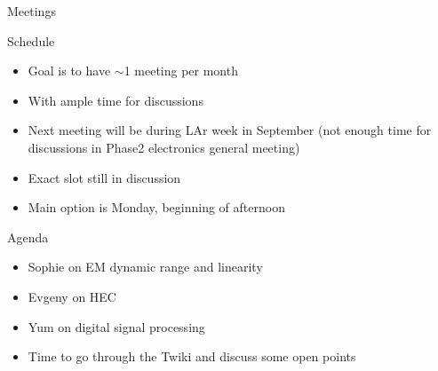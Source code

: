 \documentclass[8pt]{beamer}
\begin{document}
\begin{frame}{Meetings}
  \begin{block}{Schedule}
    \begin{itemize}
      \item Goal is to have $\sim$1 meeting per month
      \item With ample time for discussions
      \item Next meeting will be during LAr week in September (not enough time for discussions in Phase2 electronics general meeting)
      \item Exact slot still in discussion
      \item Main option is Monday, beginning of afternoon
    \end{itemize}
  \end{block}

  \begin{block}{Agenda}
    \begin{itemize}
      \item Sophie on EM dynamic range and linearity
      \item Evgeny on HEC
      \item Yum on digital signal processing
      \item Time to go through the Twiki and discuss some open points
    \end{itemize}
  \end{block}
\end{frame}
\end{document}
